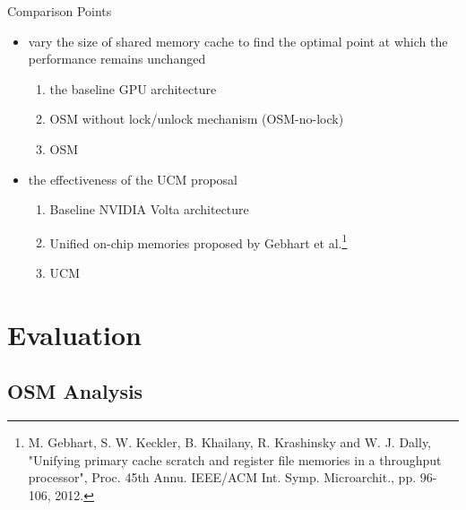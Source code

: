 \documentclass[
    fontset=fandol,
    xcolor=svgnames %
]{ctexbeamer}
\begin{document}
\begin{frame}

    \begin{block}{Comparison Points}
        \begin{itemize}
            \item vary the size of shared memory cache to find the optimal point at which the performance remains unchanged
                  \begin{enumerate}
                      \item the baseline GPU architecture
                      \item OSM without lock/unlock mechanism (OSM-no-lock)
                      \item OSM
                  \end{enumerate}
            \item the effectiveness of the UCM proposal         \begin{enumerate}
                      \item Baseline NVIDIA Volta architecture
                      \item Unified on-chip memories proposed by Gebhart et al.\footnote{M. Gebhart, S. W. Keckler, B. Khailany, R. Krashinsky and W. J. Dally, "Unifying primary cache scratch and register file memories in a throughput processor", Proc. 45th Annu. IEEE/ACM Int. Symp. Microarchit., pp. 96-106, 2012.}
                      \item UCM
                  \end{enumerate}
        \end{itemize}
    \end{block}

\end{frame}

\section{Evaluation}

\subsection{OSM Analysis}
\end{document}
